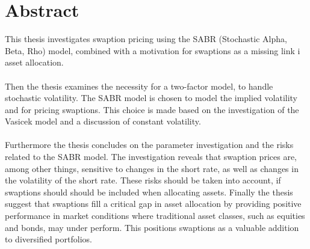 \section*{Abstract}

This thesis investigates swaption pricing using the SABR (Stochastic Alpha, Beta, Rho) model,
combined with a motivation for swaptions as a missing link i asset allocation. 
\\\\
Then the thesis examines the necessity for a two-factor model, to handle stochastic volatility.
The SABR model is chosen to model the implied volatility and for pricing swaptions. 
This choice is made based on the investigation of the Vasicek model and a discussion of constant volatility.
\\\\
Furthermore the thesis concludes on the parameter investigation and the risks related to the SABR model.
The investigation reveals that swaption prices are, among other things, sensitive to changes in the short rate, 
as well as changes in the volatility of the short rate.
These risks should be taken into account, if swaptions should should be included when allocating assets.
Finally the thesis suggest that swaptions fill a critical gap in asset allocation by providing 
positive performance in market conditions where traditional asset classes, 
such as equities and bonds, may under perform. This positions swaptions as a valuable addition to diversified portfolios.


